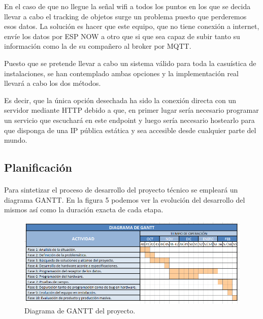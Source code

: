 \documentclass[paper=a4, fontsize=11pt,twoside]{scrartcl}	%
\begin{document}
        En el caso de que no llegue la señal wifi a todos los puntos en los que se decida llevar a cabo el tracking de objetos 
        surge un problema puesto que perderemos esos datos. La solución es hacer que este equipo, que no tiene conexión a internet,
        envíe los datos por ESP NOW a otro que si que sea capaz de subir tanto su información como la de su compañero al broker por MQTT.

        Puesto que se pretende llevar a cabo un sistema válido para toda la casuística de instalaciones, se han contemplado ambas opciones
        y la implementación real llevará a cabo los dos métodos.
        
        Es decir, que la única opción desechada ha sido la conexión directa con un servidor mediante HTTP debido a que, en primer
        lugar sería necesario programar un servicio que escuchará en este endpoint y luego sería necesario hostearlo 
        para que disponga de una IP pública estática y sea accesible desde cualquier parte del mundo.
    \subsection{Planificación}
        \paragraph{}
        Para sintetizar el proceso de desarrollo del proyecto técnico se empleará un diagrama GANTT. En la
        figura 5 podemos ver la evolución del desarrollo del mismos así como la duración exacta de cada etapa. 
        \begin{center}
            \begin{figure}[ht]
                \centering
                \includegraphics[width=1\textwidth]{diagrama de gantt.PNG}
                \caption{Diagrama de GANTT del proyecto.}
                \label{fig:mesh18}
            \end{figure}
        \end{center} 
\end{document}
